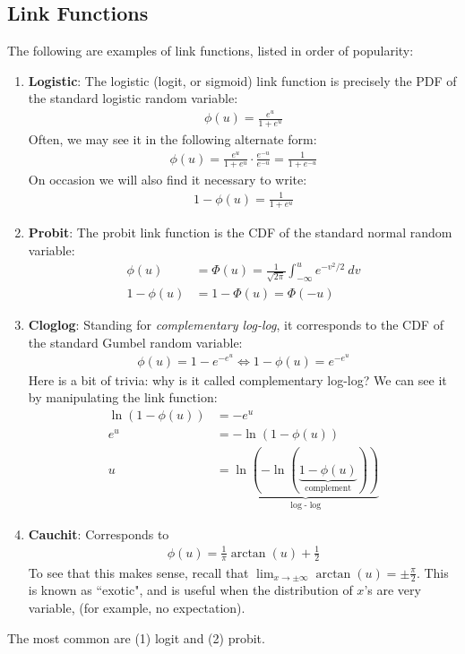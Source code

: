 \documentclass[12pt, a4paper]{article}
\theoremstyle{definition}
\begin{document}
	\subsection*{Link Functions}
	The following are examples of link functions, listed in order of popularity:
	\begin{enumerate}[label=(\arabic*)]
		\item \textbf{Logistic}: The logistic (logit, or sigmoid) link function is precisely the
		PDF of the standard logistic random variable:
		\begin{align*}
			\phi(u) = \frac{e^u}{1 + e^u}
		\end{align*}
		Often, we may see it in the following alternate form:
		\begin{align*}
			\phi(u) = \frac{e^u}{1 + e^u}\cdot \frac{e^{-u}}{e^{-u}} = \frac{1}{1 + e^{-u}}
		\end{align*}
		On occasion we will also find it necessary to write:
		\begin{align*}
			1-\phi(u) = \frac{1}{1 + e^{u}}
		\end{align*}
		\item \textbf{Probit}: The probit link function is the CDF of the standard
		normal random variable:
		\begin{align*}
			\phi(u) &= \Phi(u) = \frac{1}{\sqrt{2\pi}} \int_{-\infty}^{u}e^{-v^2/2}\ dv\\
			1-\phi(u) &= 1-\Phi(u)=\Phi(-u)
		\end{align*}
		\item \textbf{Cloglog}: Standing for \textit{complementary log-log}, it corresponds to
		the CDF of the standard Gumbel random variable:
		\begin{align*}
			\phi(u) = 1 - e^{-e^u}\iff 1-\phi(u) = e^{-e^u}
		\end{align*}
		Here is a bit of trivia: why is it called complementary log-log? We can see it
		by manipulating the link function:
		\begin{align*}
			\ln(1-\phi(u)) &= -e^u \\
			e^u &= -\ln(1-\phi(u))\\
			u&=\underbrace{\ln(-\ln(\underbrace{1-\phi(u)}_{\text{complement}}))}_{\log\text{-}\log}
		\end{align*}
		\item \textbf{Cauchit}: Corresponds to
		\begin{align*}
			\phi(u) = \frac{1}{\pi} \arctan(u) + \frac{1}{2}
		\end{align*}
		To see that this makes sense, recall that $\lim_{x\to\pm \infty}\arctan(u) = \pm \frac{\pi}{2}$.
		This is known as ``exotic", and is useful when the distribution of $x$'s are very
		variable, (for example, no expectation).
	\end{enumerate}
	The most common are (1) logit and (2) probit.
\end{document}
